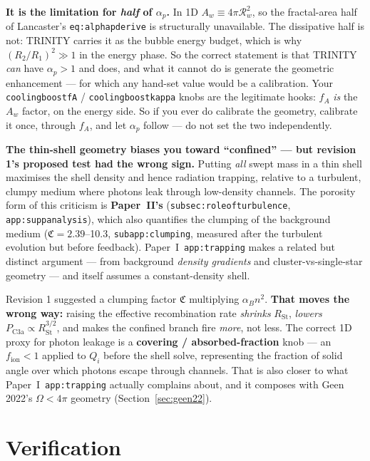 \documentclass[11pt,a4paper,oneside]{report}
\newcommand{\brkus}{\textunderscore\allowbreak}
\newcommand{\code}[1]{\texttt{\small\let\_\brkus #1}}
\newcommand{\lbl}[1]{\texttt{\footnotesize\let\_\brkus #1}}
\newcommand{\PI}{Paper~I}
\newcommand{\PII}{Paper~II}
\newcommand{\Rw}{\mathcal{R}_{w}}
\newcommand{\RSt}{R_{\mathrm{St}}}
\newcommand{\ap}{\alpha_p}
\newcommand{\PCa}{P_{\mathrm{C3a}}}
\newcommand{\up}[1]{\textcolor{tqaccent}{\textbf{#1}}}
\begin{document}
\medskip
\textbf{It is the limitation for \emph{half} of $\ap$.} In 1D $A_w\equiv4\pi\Rw^2$, so the
fractal-area half of Lancaster's \lbl{eq:alphap\_derive} is structurally unavailable. The dissipative
half is not: TRINITY carries it as the bubble energy budget, which is why $(R_2/R_1)^2\gg1$ in the
energy phase. So the correct statement is that TRINITY \emph{can} have $\ap>1$ and does, and what it
cannot do is generate the geometric enhancement --- for which any hand-set value would be a
calibration. Your \code{cooling\_boost\_fA} / \code{cooling\_boost\_kappa} knobs are the legitimate
hooks: $f_A$ \emph{is} the $A_w$ factor, on the energy side. So if you ever do calibrate the
geometry, calibrate it once, through $f_A$, and let $\ap$ follow --- do not set the two
independently.

\begin{keybox}
\textbf{\sffamily The thin-shell geometry biases you toward ``confined'' --- but revision 1's
proposed test had the wrong sign.}
Putting \emph{all} swept mass in a thin shell maximises the shell density and hence radiation
trapping, relative to a turbulent, clumpy medium where photons leak through low-density
channels. The porosity form of this criticism is \up{\PII's}
(\lbl{subsec:role\_of\_turbulence}, \lbl{app:supp\_analysis}), which also quantifies the clumping of
the background medium ($\mathfrak{C}=2.39$--10.3, \lbl{subapp:clumping}, measured after the turbulent
evolution but before feedback). \PI\ \lbl{app:trapping} makes a related but distinct argument ---
from background \emph{density gradients} and cluster-vs-single-star geometry --- and itself assumes a
constant-density shell.

Revision 1 suggested a clumping factor $\mathfrak{C}$ multiplying $\alpha_Bn^2$.
\up{That moves the wrong way:} raising the effective recombination rate \emph{shrinks} $\RSt$,
\emph{lowers} $\PCa\propto\RSt^{3/2}$, and makes the confined branch fire \emph{more}, not
less. The correct 1D proxy for photon leakage is a \up{covering / absorbed-fraction} knob ---
an $f_{\mathrm{ion}}<1$ applied to $Q_i$ before the shell solve, representing the fraction of
solid angle over which photons escape through channels. That is also closer to what \PI\
\lbl{app:trapping} actually complains about, and it composes with Geen 2022's $\Omega<4\pi$
geometry (Section~\ref{sec:geen22}).
\end{keybox}

\section{Verification}
\label{sec:verify}
\end{document}
